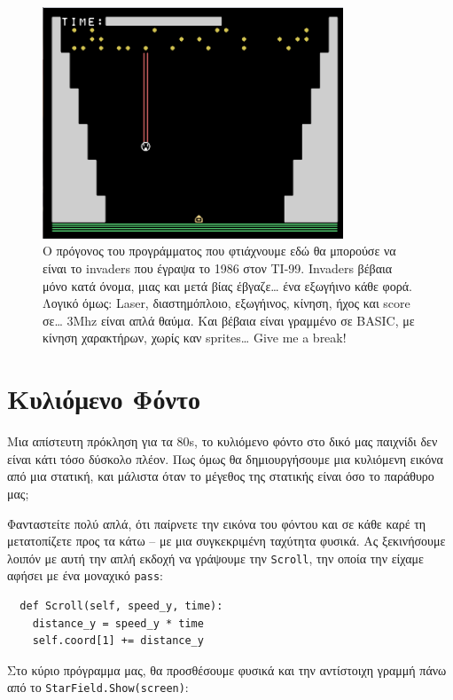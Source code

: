 \begin{figure}
\centering
\includegraphics[width=0.8\textwidth]{images/chapter8/invaders}
\caption[Invaders]{Ο πρόγονος του προγράμματος που φτιάχνουμε εδώ θα μπορούσε να είναι το invaders που έγραψα το 1986 στον ΤΙ-99. Invaders βέβαια μόνο κατά όνομα, μιας και μετά βίας έβγαζε\ldots{} ένα εξωγήινο κάθε φορά. Λογικό όμως: Laser, διαστημόπλοιο, εξωγήινος, κίνηση, ήχος και score σε\ldots{} 3Mhz είναι απλά θαύμα. Και βέβαια είναι γραμμένο σε BASIC, με κίνηση χαρακτήρων, χωρίς καν sprites\ldots{} Give me a break!}
\label{8-1}
\end{figure}
%
\section{Κυλιόμενο Φόντο}
%
Μια απίστευτη πρόκληση για τα 80s, το κυλιόμενο φόντο στο δικό μας παιχνίδι δεν είναι κάτι τόσο δύσκολο πλέον. Πως όμως θα δημιουργήσουμε μια κυλιόμενη εικόνα από μια στατική, και μάλιστα όταν το μέγεθος της στατικής είναι όσο το παράθυρο μας;

Φανταστείτε πολύ απλά, ότι παίρνετε την εικόνα του φόντου και σε κάθε καρέ τη μετατοπίζετε προς τα κάτω – με μια συγκεκριμένη ταχύτητα φυσικά. Ας ξεκινήσουμε λοιπόν με αυτή την απλή εκδοχή να γράψουμε την {\tt Scroll}, την οποία την είχαμε αφήσει με ένα μοναχικό {\tt pass}:

\begin{verbatim}
  def Scroll(self, speed_y, time):
    distance_y = speed_y * time
    self.coord[1] += distance_y
\end{verbatim}

Στο κύριο πρόγραμμα μας, θα προσθέσουμε φυσικά και την αντίστοιχη γραμμή πάνω από το {\tt StarField.Show(screen)}:

